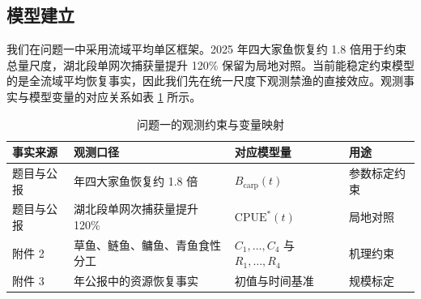 \documentclass{MMCStyle}
\begin{document}
\subsection{模型建立}
我们在问题一中采用流域平均单区框架。2025 年四大家鱼恢复约 1.8 倍用于约束总量尺度，湖北段单网次捕获量提升 120\% 保留为局地对照。当前能稳定约束模型的是全流域平均恢复事实，因此我们先在统一尺度下观测禁渔的直接效应。观测事实与模型变量的对应关系如表 \ref{tab:q1_anchor} 所示。
\begin{table}[htbp]
\centering
\caption{问题一的观测约束与变量映射}
\label{tab:q1_anchor}
\begin{tabularx}{0.95\textwidth}{>{\raggedright\arraybackslash}p{2.2cm} >{\raggedright\arraybackslash}p{3.2cm} >{\raggedright\arraybackslash}p{3.2cm} >{\raggedright\arraybackslash}X}
\toprule
事实来源 & 观测口径 & 对应模型量 & 用途 \\
\midrule
题目与公报 & 2025 年四大家鱼恢复约 1.8 倍 & $B_{\text{carp}}(t)$ & 参数标定约束 \\
题目与公报 & 湖北段单网次捕获量提升 120\% & $\mathrm{CPUE}^*(t)$ & 局地对照 \\
附件 2 & 草鱼、鲢鱼、鳙鱼、青鱼食性分工 & $C_1,\dots,C_4$ 与 $R_1,\dots,R_4$ & 机理约束 \\
附件 3 & 2022 年公报中的资源恢复事实 & 初值与时间基准 & 规模标定 \\
\bottomrule
\end{tabularx}
\end{table}
\end{document}
